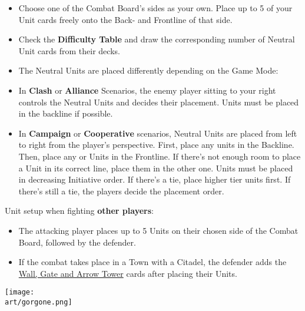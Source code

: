 \begin{multicols}{2}
\begin{itemize}
  \item Choose one of the Combat Board's sides as your own.
    Place up to 5 of your Unit cards freely onto the Back- and Frontline of that side.
  \item Check the \textbf{Difficulty Table} and draw the corresponding number of Neutral Unit cards from their decks.
  \item The Neutral Units are placed differently depending on the Game Mode:
  \item In \textbf{Clash} or \textbf{Alliance} Scenarios, the enemy player sitting to your right controls the Neutral Units and decides their placement.
     Units must be placed in the backline if possible.
  \item In \textbf{Campaign} or \textbf{Cooperative} scenarios, Neutral Units are placed from left to right from the player's perspective.
First, place any  units in the Backline.
Then, place any  or  Units in the Frontline.
If there's not enough room to place a Unit in its correct line, place them in the other one.
Units must be placed in decreasing Initiative order.
If there's a tie, place higher tier units first.
If there's still a tie, the players decide the placement order.
\end{itemize}
Unit setup when fighting \textbf{other players}:
\begin{itemize}[wide]
  \item The attacking player places up to 5 Units on their chosen side of the Combat Board, followed by the defender.
  \item If the combat takes place in a Town with a Citadel, the defender adds the \hyperlink{Walls}{Wall, Gate and Arrow Tower} cards after placing their Units.
\end{itemize}


\vspace*{\fill}
\hspace{3.6em}
\texttt{[image: \\art/gorgone.png]}


\end{multicols}
